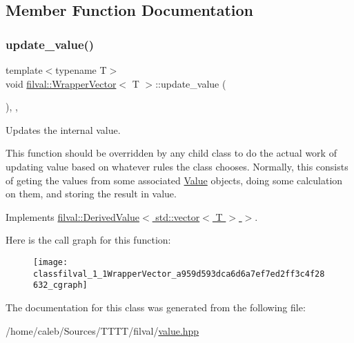 \subsection{Member Function Documentation}
\hypertarget{classfilval_1_1WrapperVector_a959d593dca6d6a7ef7ed2ff3c4f28632}{}\label{classfilval_1_1WrapperVector_a959d593dca6d6a7ef7ed2ff3c4f28632} 
\subsubsection{\texorpdfstring{update\+\_\+value()}{update\_value()}}
{\footnotesize\ttfamily template$<$typename T$>$ \\
void \hyperlink{classfilval_1_1WrapperVector}{filval\+::\+Wrapper\+Vector}$<$ T $>$\+::update\+\_\+value (\begin{DoxyParamCaption}{ }\end{DoxyParamCaption})\hspace{0.3cm}{\ttfamily [inline]}, {\ttfamily [private]}, {\ttfamily [virtual]}}



Updates the internal value. 

This function should be overridden by any child class to do the actual work of updating value based on whatever rules the class chooses. Normally, this consists of geting the values from some associated \hyperlink{classfilval_1_1Value}{Value} objects, doing some calculation on them, and storing the result in value. 

Implements \hyperlink{classfilval_1_1DerivedValue_a74e04450a550454510329a9e6b941304}{filval\+::\+Derived\+Value$<$ std\+::vector$<$ T $>$ $>$}.

Here is the call graph for this function\+:
\nopagebreak
\begin{figure}[H]
\begin{center}
\leavevmode
\texttt{[image: classfilval\_1\_1WrapperVector\_a959d593dca6d6a7ef7ed2ff3c4f28632\_cgraph]}
\end{center}
\end{figure}


The documentation for this class was generated from the following file\+:\begin{DoxyCompactItemize}
\item 
/home/caleb/\+Sources/\+T\+T\+T\+T/filval/\hyperlink{value_8hpp}{value.\+hpp}\end{DoxyCompactItemize}
